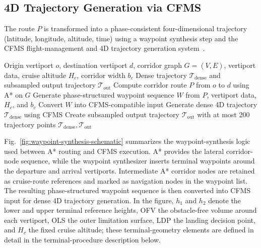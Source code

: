 \subsection{4D Trajectory Generation via CFMS}
\label{sec:trajectory_generation}

The route \(P\) is transformed into a phase-consistent four-dimensional trajectory (latitude, longitude, altitude, time) using a waypoint synthesis step and the CFMS flight-management and 4D trajectory generation system~\cite{morscheck2021cfms}.

\begin{algorithm}[htbp]
\caption{Planner pipeline for 4D trajectory generation}
\label{alg:planner_pipeline}
\begin{algorithmic}[1]
\REQUIRE Origin vertiport \(o\), destination vertiport \(d\), corridor graph \(G=(V,E)\), vertiport data, cruise altitude \(H_c\), corridor width \(b_c\)
\ENSURE Dense trajectory \(\mathcal{T}_{\mathrm{dense}}\) and subsampled output trajectory \(\mathcal{T}_{\mathrm{out}}\)
\STATE Compute corridor route \(P\) from \(o\) to \(d\) using A* on \(G\)
\STATE Generate phase-structured waypoint sequence \(W\) from \(P\), vertiport data, \(H_c\), and \(b_c\)
\STATE Convert \(W\) into CFMS-compatible input
\STATE Generate dense 4D trajectory \(\mathcal{T}_{\mathrm{dense}}\) using CFMS
\STATE Create subsampled output trajectory \(\mathcal{T}_{\mathrm{out}}\) with at most 200 trajectory points
\RETURN \(\mathcal{T}_{\mathrm{dense}}, \mathcal{T}_{\mathrm{out}}\)
\end{algorithmic}
\end{algorithm}

Fig.~\ref{fig:waypoint-synthesis-schematic} summarizes the waypoint-synthesis logic used between A* routing and CFMS execution. A* provides the lateral corridor-node sequence, while the waypoint synthesizer inserts terminal waypoints around the departure and arrival vertiports. Intermediate A* corridor nodes are retained as cruise-route references and marked as navigation nodes in the waypoint list. The resulting phase-structured waypoint sequence is then converted into CFMS input for dense 4D trajectory generation. In the figure, \(h_1\) and \(h_2\) denote the lower and upper terminal reference heights, OFV the obstacle-free volume around each vertiport, OLS the outer limitation surface, LDP the landing decision point, and \(H_c\) the fixed cruise altitude; these terminal-geometry elements are defined in detail in the terminal-procedure description below.

